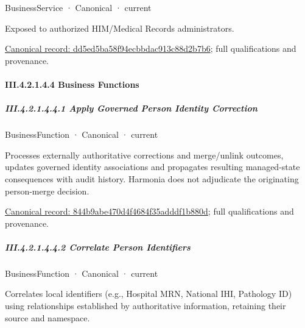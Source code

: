 \label{element:dd5ed5ba58f94ecbbdac913c88d2b7b6}
{\small BusinessService · Canonical · current}\par

Exposed to authorized HIM/Medical Records administrators.


{\footnotesize \href{../../../../continuum/business/business-service/dd5ed5ba58f94ecbbdac913c88d2b7b6.md}{Canonical record: dd5ed5ba58f94ecbbdac913c88d2b7b6}; full qualifications and provenance.}\par
\paragraph*{III.4.2.1.4.4 Business Functions}
\label{navigation:III.4.2.1.4.4}

\subparagraph*{III.4.2.1.4.4.1 Apply Governed Person Identity Correction}
\label{navigation:III.4.2.1.4.4.1}

\label{element:844b9abe470d4f4684f35adddf1b880d}
{\small BusinessFunction · Canonical · current}\par

Processes externally authoritative corrections and merge/unlink outcomes, updates governed identity associations and propagates resulting managed-state consequences with audit history. Harmonia does not adjudicate the originating person-merge decision.


{\footnotesize \href{../../../../continuum/business/business-function/844b9abe470d4f4684f35adddf1b880d.md}{Canonical record: 844b9abe470d4f4684f35adddf1b880d}; full qualifications and provenance.}\par
\subparagraph*{III.4.2.1.4.4.2 Correlate Person Identifiers}
\label{navigation:III.4.2.1.4.4.2}

\label{element:3050366e2e1d47eeaa4cfd6db92c0a56}
{\small BusinessFunction · Canonical · current}\par

Correlates local identifiers (e.g., Hospital MRN, National IHI, Pathology ID) using relationships established by authoritative information, retaining their source and namespace.


